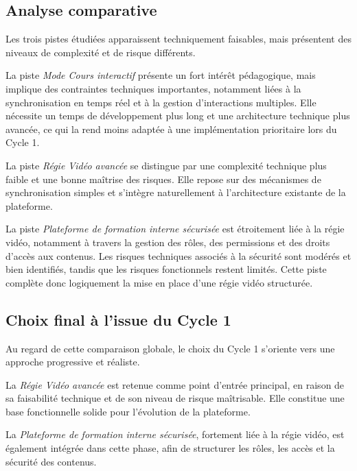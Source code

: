 \documentclass[12pt,a4paper]{report}
\begin{document}
\subsection{Analyse comparative}

Les trois pistes étudiées apparaissent techniquement faisables, mais présentent
des niveaux de complexité et de risque différents.

La piste \textit{Mode Cours interactif} présente un fort intérêt pédagogique,
mais implique des contraintes techniques importantes, notamment liées à la
synchronisation en temps réel et à la gestion d’interactions multiples.
Elle nécessite un temps de développement plus long et une architecture technique
plus avancée, ce qui la rend moins adaptée à une implémentation prioritaire lors
du Cycle 1.

La piste \textit{Régie Vidéo avancée} se distingue par une complexité technique
plus faible et une bonne maîtrise des risques.
Elle repose sur des mécanismes de synchronisation simples et s’intègre
naturellement à l’architecture existante de la plateforme.

La piste \textit{Plateforme de formation interne sécurisée} est étroitement liée
à la régie vidéo, notamment à travers la gestion des rôles, des permissions et des
droits d’accès aux contenus.
Les risques techniques associés à la sécurité sont modérés et bien identifiés,
tandis que les risques fonctionnels restent limités.
Cette piste complète donc logiquement la mise en place d’une régie vidéo
structurée.

\subsection{Choix final à l’issue du Cycle 1}

Au regard de cette comparaison globale, le choix du Cycle 1 s’oriente vers une
approche progressive et réaliste.

La \textit{Régie Vidéo avancée} est retenue comme point d’entrée principal, en
raison de sa faisabilité technique et de son niveau de risque maîtrisable.
Elle constitue une base fonctionnelle solide pour l’évolution de la plateforme.

La \textit{Plateforme de formation interne sécurisée}, fortement liée à la régie
vidéo, est également intégrée dans cette phase, afin de structurer les rôles,
les accès et la sécurité des contenus.
\end{document}
